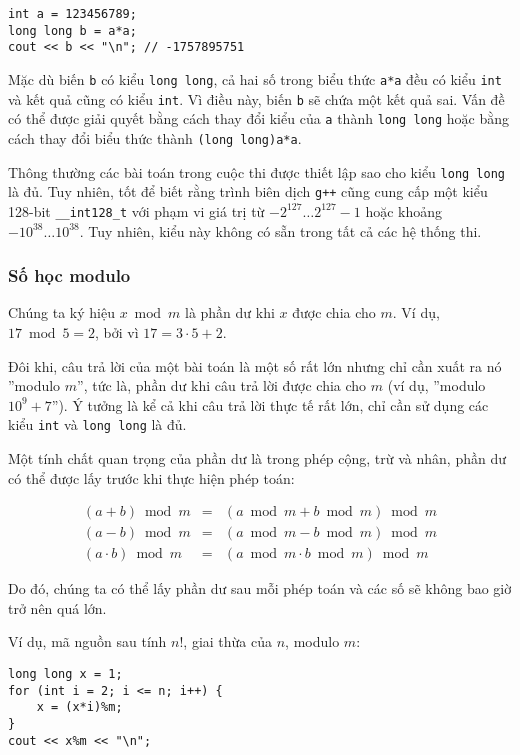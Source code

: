 \begin{lstlisting}
int a = 123456789;
long long b = a*a;
cout << b << "\n"; // -1757895751
\end{lstlisting}

Mặc dù biến \texttt{b} có kiểu \texttt{long long},
cả hai số trong biểu thức \texttt{a*a}
đều có kiểu \texttt{int} và kết quả cũng
có kiểu \texttt{int}.
Vì điều này, biến \texttt{b} sẽ
chứa một kết quả sai.
Vấn đề có thể được giải quyết bằng cách thay đổi kiểu
của \texttt{a} thành \texttt{long long} hoặc
bằng cách thay đổi biểu thức thành \texttt{(long long)a*a}.

Thông thường các bài toán trong cuộc thi được thiết lập sao cho
kiểu \texttt{long long} là đủ.
Tuy nhiên, tốt để biết rằng
trình biên dịch \texttt{g++} cũng cung cấp
một kiểu 128-bit \texttt{\_\_int128\_t}
với phạm vi giá trị từ
$-2^{127} \ldots 2^{127}-1$ hoặc khoảng $-10^{38} \ldots 10^{38}$.
Tuy nhiên, kiểu này không có sẵn trong tất cả các hệ thống thi.

\subsubsection{Số học modulo}


Chúng ta ký hiệu $x \bmod m$ là phần dư
khi $x$ được chia cho $m$.
Ví dụ, $17 \bmod 5 = 2$,
bởi vì $17 = 3 \cdot 5 + 2$.

Đôi khi, câu trả lời của một bài toán là một
số rất lớn nhưng chỉ cần
xuất ra nó ''modulo $m$'', tức là,
phần dư khi câu trả lời được chia cho $m$
(ví dụ, ''modulo $10^9+7$'').
Ý tưởng là kể cả khi câu trả lời thực tế
rất lớn,
chỉ cần sử dụng các kiểu
\texttt{int} và \texttt{long long} là đủ.

Một tính chất quan trọng của phần dư là
trong phép cộng, trừ và nhân,
phần dư có thể được lấy trước khi thực hiện phép toán:

\[
\begin{array}{rcr}
(a+b) \bmod m & = & (a \bmod m + b \bmod m) \bmod m \\
(a-b) \bmod m & = & (a \bmod m - b \bmod m) \bmod m \\
(a \cdot b) \bmod m & = & (a \bmod m \cdot b \bmod m) \bmod m
\end{array}
\]

Do đó, chúng ta có thể lấy phần dư sau mỗi phép toán
và các số sẽ không bao giờ trở nên quá lớn.

Ví dụ, mã nguồn sau tính $n!$,
giai thừa của $n$, modulo $m$:
\begin{lstlisting}
long long x = 1;
for (int i = 2; i <= n; i++) {
    x = (x*i)%m;
}
cout << x%m << "\n";
\end{lstlisting}

